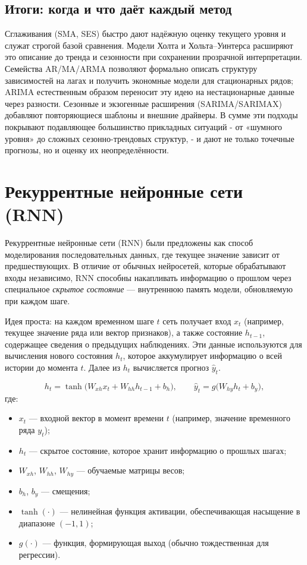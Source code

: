 \documentclass[12pt,a4paper]{article}
\begin{document}
\subsection{Итоги: когда и что даёт каждый метод}
Сглаживания (SMA, SES) быстро дают надёжную оценку текущего уровня и служат строгой базой сравнения. Модели Холта и Хольта–Уинтерса расширяют это описание до тренда и сезонности при сохранении прозрачной интерпретации. Семейства AR/MA/ARMA позволяют формально описать структуру зависимостей на лагах и получить экономные модели для стационарных рядов; ARIMA естественным образом переносит эту идею на нестационарные данные через разности. Сезонные и экзогенные расширения (SARIMA/SARIMAX) добавляют повторяющиеся шаблоны и внешние драйверы. В сумме эти подходы покрывают подавляющее большинство прикладных ситуаций - от «шумного уровня» до сложных сезонно-трендовых структур, - и дают не только точечные прогнозы, но и оценку их неопределённости.


\section{Рекуррентные нейронные сети (RNN)}
Рекуррентные нейронные сети (RNN) были предложены как способ моделирования последовательных данных, где текущее значение зависит от предшествующих. В отличие от обычных нейросетей, которые обрабатывают входы независимо, RNN способны накапливать информацию о прошлом через специальное \textit{скрытое состояние} — внутреннюю память модели, обновляемую при каждом шаге.

Идея проста: на каждом временном шаге $t$ сеть получает вход $x_t$ (например, текущее значение ряда или вектор признаков), а также состояние $h_{t-1}$, содержащее сведения о предыдущих наблюдениях. Эти данные используются для вычисления нового состояния $h_t$, которое аккумулирует информацию о всей истории до момента $t$. Далее из $h_t$ вычисляется прогноз $\hat{y}_t$.

\begin{equation*}
h_t = \tanh\!\bigl(W_{xh} x_t + W_{hh} h_{t-1} + b_h\bigr), \qquad
\hat{y}_t = g\!\bigl(W_{hy} h_t + b_y\bigr),
\end{equation*}
где:
\begin{itemize}
    \item $x_t$ — входной вектор в момент времени $t$ (например, значение временного ряда $y_t$);
    \item $h_t$ — скрытое состояние, которое хранит информацию о прошлых шагах;
    \item $W_{xh}$, $W_{hh}$, $W_{hy}$ — обучаемые матрицы весов;
    \item $b_h$, $b_y$ — смещения;
    \item $\tanh(\cdot)$ — нелинейная функция активации, обеспечивающая насыщение в диапазоне $(-1, 1)$;
    \item $g(\cdot)$ — функция, формирующая выход (обычно тождественная для регрессии).
\end{itemize}
\end{document}
